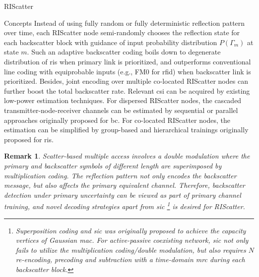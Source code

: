 \documentclass[journal]{IEEEtran}
\newtheorem{remark}{Remark}
\begin{document}
\begin{section}{RIScatter}
\begin{subsection}{Concepts}
		Instead of using fully random or fully deterministic reflection pattern over time, each RIScatter node semi-randomly chooses the reflection state for each backscatter block with guidance of input probability distribution $P(\Gamma_m)$ at state $m$.
		Such an adaptive backscatter coding boils down to degenerate distribution of \gls{ris} when primary link is prioritized, and outperforms conventional line coding with equiprobable inputs (e.g., FM0 for \gls{rfid}) when backscatter link is prioritized.
		Besides, joint encoding over multiple co-located RIScatter nodes can further boost the total backscatter rate.
		Relevant \gls{csi} can be acquired by existing low-power estimation techniques.
		For dispersed RIScatter nodes, the cascaded transmitter-node-receiver channels can be estimated by sequential \cite{Bharadia2015,Yang2015b,Guo2019g} or parallel approaches \cite{Jin2021a} originally proposed for \gls{bc}.
		For co-located RIScatter nodes, the estimation can be simplified by group-based \cite{Zheng2019} and hierarchical \cite{You2019} trainings originally proposed for \gls{ris}.

		\begin{remark}
			Scatter-based multiple access involves a double modulation where the primary and backscatter symbols of different length are superimposed by multiplication coding.
			The reflection pattern not only encodes the backscatter message, but also affects the primary equivalent channel.
			Therefore, backscatter detection under primary uncertainty can be viewed as part of primary channel training, and novel decoding strategies apart from \gls{sic}
			\footnote{
				Superposition coding and \gls{sic} was originally proposed to achieve the capacity vertices of Gaussian \gls{mac}.
				For active-passive coexisting network, \gls{sic} not only fails to utilize the multiplication coding/double modulation, but also requires $N$ re-encoding, precoding and subtraction with a time-domain \gls{mrc} during each backscatter block.
			}
			is desired for RIScatter.
		\end{remark}


\end{subsection}
\end{section}
\end{document}

